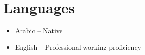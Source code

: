 \section*{Languages}
\begin{itemize}
    \item Arabic -- Native
    \item English -- Professional working proficiency
\end{itemize}
